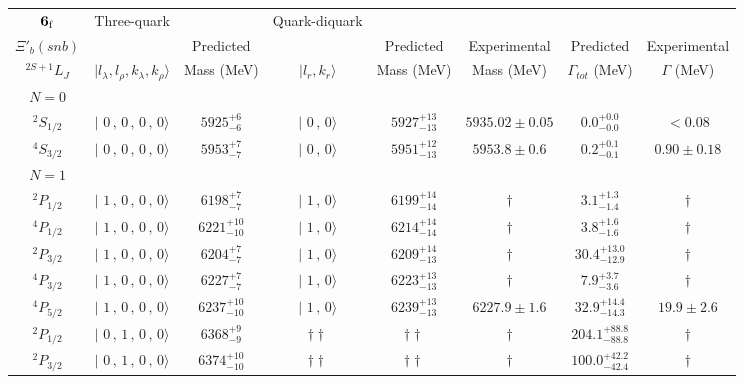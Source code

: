 \begin{tabular}{c| c c c c c c c}\hline \hline
${\bf {6}}_{\rm f}$  & Three-quark & & Quark-diquark   &             &      &        &  \\ 
$\Xi'_{b}(snb)$ &   & Predicted  &   &  Predicted   &  Experimental &  Predicted            & Experimental \\ 
 $^{2S+1}L_{J}$ & $\vert l_{\lambda}, l_{\rho}, k_{\lambda}, k_{\rho} \rangle$ & Mass (MeV)  & $\vert l_{r}, k_{r} \rangle$  &  Mass (MeV)   &  Mass (MeV)   &  $\Gamma_{tot}$ (MeV) & $\Gamma$ (MeV) \\ \hline
\hline
 $N=0$  &  &  &  &  &  \\ 
$^{2}S_{1/2}$ & $\vert \,\,0\,,\,0\,,\,0\,,\,0 \rangle $ & $5925^{+6}_{-6}$ & $\vert \,\,0\,,\,0 \rangle$ & $5927^{+13}_{-13}$ & $5935.02\pm 0.05$ & $0.0^{+0.0}_{-0.0}$ & $<0.08$ \\ 
$^{4}S_{3/2}$ & $\vert \,\,0\,,\,0\,,\,0\,,\,0 \rangle $ & $5953^{+7}_{-7}$ & $\vert \,\,0\,,\,0 \rangle$ & $5951^{+12}_{-13}$ & $5953.8\pm 0.6$ & $0.2^{+0.1}_{-0.1}$ & $0.90\pm 0.18$ \\ 
\hline
 $N=1$  &  &  &  &  &  \\ 
$^{2}P_{1/2}$ & $\vert \,\,1\,,\,0\,,\,0\,,\,0 \rangle $ & $6198^{+7}_{-7}$ & $\vert \,\,1\,,\,0 \rangle$ & $6199^{+14}_{-14}$ & $\dagger$ & $3.1^{+1.3}_{-1.4}$ & $\dagger$ \\ 
$^{4}P_{1/2}$ & $\vert \,\,1\,,\,0\,,\,0\,,\,0 \rangle $ & $6221^{+10}_{-10}$ & $\vert \,\,1\,,\,0 \rangle$ & $6214^{+14}_{-14}$ & $\dagger$ & $3.8^{+1.6}_{-1.6}$ & $\dagger$ \\ 
$^{2}P_{3/2}$ & $\vert \,\,1\,,\,0\,,\,0\,,\,0 \rangle $ & $6204^{+7}_{-7}$ & $\vert \,\,1\,,\,0 \rangle$ & $6209^{+14}_{-13}$ & $\dagger$ & $30.4^{+13.0}_{-12.9}$ & $\dagger$ \\ 
$^{4}P_{3/2}$ & $\vert \,\,1\,,\,0\,,\,0\,,\,0 \rangle $ & $6227^{+7}_{-7}$ & $\vert \,\,1\,,\,0 \rangle$ & $6223^{+13}_{-13}$ & $\dagger$ & $7.9^{+3.7}_{-3.6}$ & $\dagger$ \\ 
$^{4}P_{5/2}$ & $\vert \,\,1\,,\,0\,,\,0\,,\,0 \rangle $ & $6237^{+10}_{-10}$ & $\vert \,\,1\,,\,0 \rangle$ & $6239^{+13}_{-13}$ & $6227.9\pm 1.6$ & $32.9^{+14.4}_{-14.3}$ & $19.9\pm 2.6$ \\ 
$^{2}P_{1/2}$ & $\vert \,\,0\,,\,1\,,\,0\,,\,0 \rangle $ & $6368^{+9}_{-9}$ & $\dagger\dagger$ & $\dagger\dagger$ & $\dagger$ & $204.1^{+88.8}_{-88.8}$ & $\dagger$ \\ 
$^{2}P_{3/2}$ & $\vert \,\,0\,,\,1\,,\,0\,,\,0 \rangle $ & $6374^{+10}_{-10}$ & $\dagger\dagger$ & $\dagger\dagger$ & $\dagger$ & $100.0^{+42.2}_{-42.4}$ & $\dagger$ \\ 

\end{tabular}
